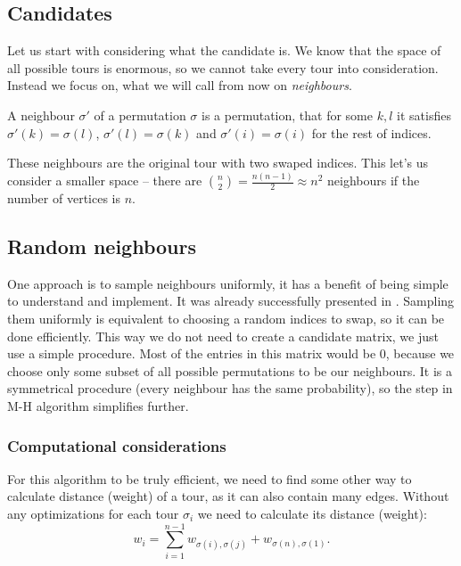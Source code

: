 \subsection{Candidates}
	Let us start with considering what the candidate is. We know that the space of all possible tours is enormous, so we cannot take every tour into consideration. Instead we focus on, what we will call from now on \textit{neighbours}.
	\begin{definition}
		A neighbour $\sigma'$ of a permutation $\sigma$ is a permutation, that for some $k, l$ it satisfies $\sigma'(k) = \sigma(l)$, $\sigma'(l) = \sigma(k)$ and $\sigma'(i) = \sigma(i)$ for the rest of indices.
	\end{definition}
	These neighbours are the original tour with two swaped indices. This let's us consider a smaller space -- there are $\binom{n}{2} = \frac{n(n-1)}{2} \approx n^2$ neighbours if the number of vertices is $n$.

\subsection{Random neighbours}
	One approach is to sample neighbours uniformly, it has a benefit of being simple to understand and implement. It was already successfully presented in \cite{decryption_tsp_MCMC}. Sampling them uniformly is equivalent to choosing a random indices to swap, so it can be done efficiently. This way we do not need to create a candidate matrix, we just use a simple procedure. Most of the entries in this matrix would be $0$, because we choose only some subset of all possible permutations to be our neighbours. It is a symmetrical procedure (every neighbour has the same probability), so the step in M-H algorithm simplifies further.
	
	\subsubsection{Computational considerations}
		For this algorithm to be truly efficient, we need to find some other way to calculate distance (weight) of a tour, as it can also contain many edges. Without any optimizations for each tour $\sigma_i$ we need to calculate its distance (weight):
		\begin{equation*}
			w_i = \sum_{i=1}^{n-1} w_{\sigma(i), \sigma(j)} + w_{\sigma(n), \sigma(1)}.
		\end{equation*}
		

